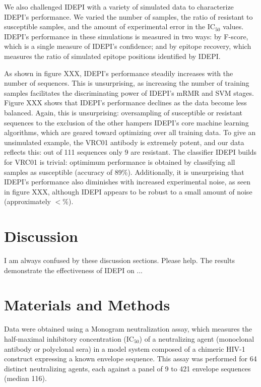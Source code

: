 \documentclass[10pt]{article}
\newcommand{\hmic}{{IC}$_{50}$}
\newcommand{\idepi}{{IDEPI}}
\newcommand{\hiv}{{HIV}-1}
\newcommand{\mrmr}{{mRMR}}
\newcommand{\svm}{{SVM}}
\begin{document}
We also challenged \idepi{} with a variety of simulated data to characterize \idepi{}'s performance.
We varied the number of samples,
the ratio of resistant to susceptible samples,
and the amount of experimental error in the \hmic{} values.
\idepi{}'s performance in these simulations is measured in two ways:
by F-score, which is a single measure of \idepi{}'s confidence;
and by epitope recovery, which measures the ratio of simulated epitope positions identified by \idepi{}.

As shown in figure XXX, \idepi{}'s performance steadily increases with the number of sequences.
This is unsurprising, as increasing the number of training samples facilitates the discriminating power of \idepi{}'s \mrmr{} and \svm{} stages.
Figure XXX shows that \idepi{}'s performance declines as the data become less balanced.
Again, this is unsurprising: oversampling of susceptible or resistant sequences to the exclusion of the other
hampers \idepi{}'s core machine learning algorithms,
which are geared toward optimizing over all training data.
To give an unsimulated example, the {VRC01} antibody is extremely potent,
and our data reflects this: out of 111 sequences only 9 are resistant.
The classifier \idepi{} builds for {VRC01} is trivial:
optimimum performance is obtained by classifying all samples as susceptible (accuracy of 89\%).
Additionally, it is unsurprising that \idepi{}'s performance also diminishes with increased experimental noise,
as seen in figure XXX, although \idepi{} appears to be robust to a small amount of noise (approximately $ < \%$).

\section*{Discussion}

I am always confused by these discussion sections. Please help.
The results demonstrate the effectiveness of \idepi{} on ...

\section*{Materials and Methods}
Data were obtained using a Monogram neutralization assay,
which measures the half-maximal inhibitory concentration (\hmic{})
of a neutralizing agent (monoclonal antibody or polyclonal sera) in a model system composed of a chimeric \hiv{} construct expressing a known envelope sequence.
This assay was performed for 64 distinct neutralizing agents, each against a panel of 9 to 421 envelope sequences (median 116).
\end{document}
